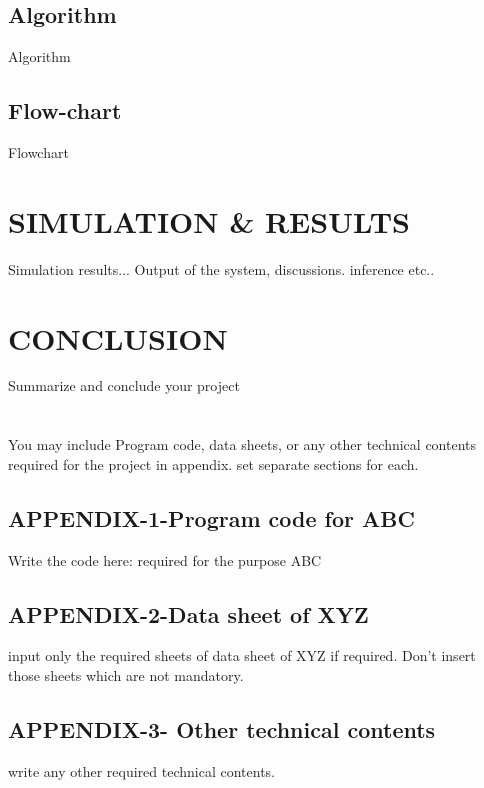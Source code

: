 \documentclass[12pt,a4paper]{report}
\begin{document}
\section{Algorithm}
Algorithm

\section{Flow-chart}
Flowchart

\chapter{SIMULATION \& RESULTS}

Simulation results... Output of the system, discussions. inference etc..


\chapter{CONCLUSION}

Summarize and conclude your project



\chapter*{}

You may include Program code, data sheets, or any other technical contents required for the project in appendix. set separate sections for each.
\section*{APPENDIX-1-Program code for ABC}


{Write the code here: required for the purpose ABC}


\newpage
\section*{APPENDIX-2-Data sheet of XYZ}

{input only the required sheets of data sheet of XYZ if required. Don't insert those sheets which are not mandatory.}


\newpage
\section*{APPENDIX-3- Other technical contents }

{write any other required technical contents.}
\end{document}
